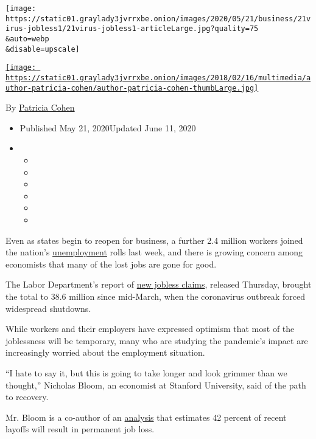 \texttt{[image: https://static01.graylady3jvrrxbe.onion/images/2020/05/21/business/21virus-jobless1/21virus-jobless1-articleLarge.jpg?quality=75\\\&auto=webp\\\&disable=upscale]}

\href{https://www.nytimes3xbfgragh.onion/by/patricia-cohen}{\texttt{[image: https://static01.graylady3jvrrxbe.onion/images/2018/02/16/multimedia/author-patricia-cohen/author-patricia-cohen-thumbLarge.jpg]}}

By \href{https://www.nytimes3xbfgragh.onion/by/patricia-cohen}{Patricia
Cohen}

\begin{itemize}
\item
  Published May 21, 2020Updated June 11, 2020
\item
  \begin{itemize}
  \item
  \item
  \item
  \item
  \item
  \item
  \end{itemize}
\end{itemize}

Even as states begin to reopen for business, a further 2.4 million
workers joined the nation's
\href{https://www.nytimes3xbfgragh.onion/2020/06/11/business/economy/unemployment-claims-coronavirus.html}{unemployment}
rolls last week, and there is growing concern among economists that many
of the lost jobs are gone for good.

The Labor Department's report of
\href{https://www.nytimes3xbfgragh.onion/2020/06/04/business/economy/coronavirus-unemployment-claims.html}{new
jobless claims}, released Thursday, brought the total to 38.6 million
since mid-March, when the coronavirus outbreak forced widespread
shutdowns.

While workers and their employers have expressed optimism that most of
the joblessness will be temporary, many who are studying the pandemic's
impact are increasingly worried about the employment situation.

``I hate to say it, but this is going to take longer and look grimmer
than we thought,'' Nicholas Bloom, an economist at Stanford University,
said of the path to recovery.

Mr. Bloom is a co-author of an
\href{https://bfi.uchicago.edu/wp-content/uploads/BFI_WP_202059.pdf}{analysis}
that estimates 42 percent of recent layoffs will result in permanent job
loss.

